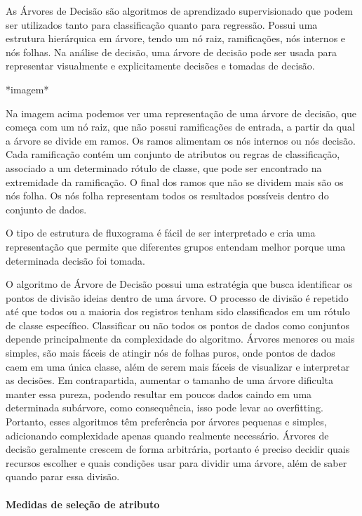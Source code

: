 \documentclass[
  letterpaper,
  DIV=11,
  numbers=noendperiod]{scrreprt}
\let\oldparagraph\paragraph
\renewcommand{\paragraph}[1]{\oldparagraph{#1}\mbox{}}
\begin{document}
As Árvores de Decisão são algoritmos de aprendizado supervisionado que
podem ser utilizados tanto para classificação quanto para regressão.
Possui uma estrutura hierárquica em árvore, tendo um nó raiz,
ramificações, nós internos e nós folhas. Na análise de decisão, uma
árvore de decisão pode ser usada para representar visualmente e
explicitamente decisões e tomadas de decisão.

*imagem*

Na imagem acima podemos ver uma representação de uma árvore de decisão,
que começa com um nó raiz, que não possui ramificações de entrada, a
partir da qual a árvore se divide em ramos. Os ramos alimentam os nós
internos ou nós decisão. Cada ramificação contém um conjunto de
atributos ou regras de classificação, associado a um determinado rótulo
de classe, que pode ser encontrado na extremidade da ramificação. O
final dos ramos que não se dividem mais são os nós folha. Os nós folha
representam todos os resultados possíveis dentro do conjunto de dados.

O tipo de estrutura de fluxograma é fácil de ser interpretado e cria uma
representação que permite que diferentes grupos entendam melhor porque
uma determinada decisão foi tomada.

O algoritmo de Árvore de Decisão possui uma estratégia que busca
identificar os pontos de divisão ideias dentro de uma árvore. O processo
de divisão é repetido até que todos ou a maioria dos registros tenham
sido classificados em um rótulo de classe específico. Classificar ou não
todos os pontos de dados como conjuntos depende principalmente da
complexidade do algoritmo. Árvores menores ou mais simples, são mais
fáceis de atingir nós de folhas puros, onde pontos de dados caem em uma
única classe, além de serem mais fáceis de visualizar e interpretar as
decisões. Em contrapartida, aumentar o tamanho de uma árvore dificulta
manter essa pureza, podendo resultar em poucos dados caindo em uma
determinada subárvore, como consequência, isso pode levar ao
overfitting. Portanto, esses algoritmos têm preferência por árvores
pequenas e simples, adicionando complexidade apenas quando realmente
necessário. Árvores de decisão geralmente crescem de forma arbitrária,
portanto é preciso decidir quais recursos escolher e quais condições
usar para dividir uma árvore, além de saber quando parar essa divisão.

\hypertarget{medidas-de-seleuxe7uxe3o-de-atributo}{%
\paragraph{Medidas de seleção de
atributo}\label{medidas-de-seleuxe7uxe3o-de-atributo}}
\end{document}
